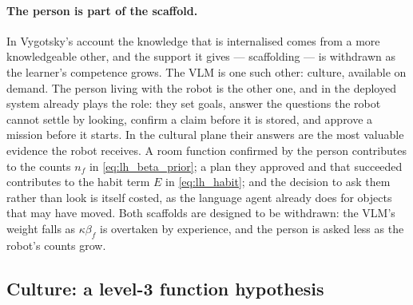 \paragraph{The person is part of the scaffold.}
In Vygotsky's account the knowledge that is internalised comes from a more knowledgeable other, and the support it
gives --- scaffolding \cite{wood1976role} --- is withdrawn as the learner's competence grows. The VLM is one such
other: culture, available on demand. The person living with the robot is the other one, and in the deployed system
already plays the role: they set goals, answer the questions the robot cannot settle by looking, confirm a claim
before it is stored, and approve a mission before it starts. In the cultural plane their answers are the most
valuable evidence the robot receives. A room function confirmed by the person contributes to the counts $n_f$ in
\eqref{eq:lh_beta_prior}; a plan they approved and that succeeded contributes to the habit term $E$ in
\eqref{eq:lh_habit}; and the decision to ask them rather than look is itself costed, as the language agent already
does for objects that may have moved. Both scaffolds are designed to be withdrawn: the VLM's weight falls as
$\kappa\beta_f$ is overtaken by experience, and the person is asked less as the robot's counts grow.

\subsection{Culture: a level-3 function hypothesis}
\label{sec:lang_hierarchy:culture}

